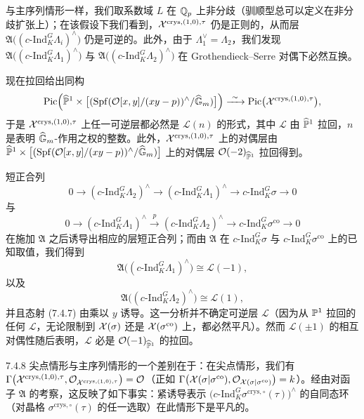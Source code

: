 与主序列情形一样，我们取系数域 $L$ 在 $\mathbb{Q}_p$ 上非分歧（驯顺型总可以定义在非分歧扩张上）；在该假设下我们看到，$\mathcal{X}^{\mathrm{crys},(1,0),\tau}$ 仍是正则的，从而层 $\mathfrak A\bigl((c\text{-}\mathrm{Ind}_K^G\Lambda_i)^\wedge\bigr)$ 仍是可逆的。此外，由于 $\Lambda_1^\vee=\Lambda_2$，我们发现 $\mathfrak A\bigl((c\text{-}\mathrm{Ind}_K^G\Lambda_1)^\wedge\bigr)$ 与 $\mathfrak A\bigl((c\text{-}\mathrm{Ind}_K^G\Lambda_2)^\wedge\bigr)$ 在 Grothendieck--Serre 对偶下必然互换。

现在拉回给出同构
\[
\mathrm{Pic}\Bigl(\widehat{\mathbb{P}}^{1}\times\bigl[(\operatorname{Spf}(\mathcal{O}[x,y]/(xy-p))^{\wedge}/\widehat{\mathbb{G}}_m)\bigr]\Bigr)
\xrightarrow{\ \sim\ }\mathrm{Pic}\bigl(\mathcal{X}^{\mathrm{crys},(1,0),\tau}\bigr),
\]
于是 $\mathcal{X}^{\mathrm{crys},(1,0),\tau}$ 上任一可逆层都必然是 $\mathcal L(n)$ 的形式，其中 $\mathcal L$ 由 $\widehat{\mathbb{P}}^{1}$ 拉回，$n$ 是表明 $\widehat{\mathbb{G}}_m$-作用之权的整数。此外，$\mathcal{X}^{\mathrm{crys},(1,0),\tau}$ 上的对偶层由 $\widehat{\mathbb{P}}^{1}\times\bigl[(\operatorname{Spf}(\mathcal{O}[x,y]/(xy-p))^{\wedge}/\widehat{\mathbb{G}}_m)\bigr]$ 上的对偶层 $\mathcal{O}(-2)_{\widehat{\mathbb{P}}^{1}}$ 拉回得到。

短正合列
\[
0\to(c\text{-}\mathrm{Ind}_K^G\Lambda_2)^\wedge\to(c\text{-}\mathrm{Ind}_K^G\Lambda_1)^\wedge\to c\text{-}\mathrm{Ind}_K^G\sigma\to0
\]
与
\[
0\to(c\text{-}\mathrm{Ind}_K^G\Lambda_1)^\wedge\xrightarrow{\ p\ }(c\text{-}\mathrm{Ind}_K^G\Lambda_2)^\wedge\to c\text{-}\mathrm{Ind}_K^G\sigma^{\mathrm{co}}\to0
\]
在施加 $\mathfrak A$ 之后诱导出相应的层短正合列；而由 $\mathfrak A$ 在 $c\text{-}\mathrm{Ind}_K^G\sigma$ 与 $c\text{-}\mathrm{Ind}_K^G\sigma^{\mathrm{co}}$ 上的已知取值，我们得到
\[
\mathfrak A\bigl((c\text{-}\mathrm{Ind}_K^G\Lambda_1)^\wedge\bigr)\cong\mathcal L(-1),
\]
以及
\[
\mathfrak A\bigl((c\text{-}\mathrm{Ind}_K^G\Lambda_2)^\wedge\bigr)\cong\mathcal L(1),
\]
并且态射 (7.4.7) 由乘以 $y$ 诱导。这一分析并不确定可逆层 $\mathcal L$（因为从 $\mathbb{P}^{1}$ 拉回的任何 $\mathcal L$，无论限制到 $\mathcal{X}(\sigma)$ 还是 $\mathcal{X}(\sigma^{\mathrm{co}})$ 上，都必然平凡）。然而 $\mathcal L(\pm1)$ 的相互对偶性随后表明，$\mathcal L$ 必是 $\mathcal{O}(-1)_{\widehat{\mathbb{P}}^{1}}$ 的拉回。

\begin{rem}{7.4.8}\label{thm:a4-7-4-8}
尖点情形与主序列情形的一个差别在于：在尖点情形，我们有 $\Gamma\bigl(\mathcal{X}^{\mathrm{crys},(1,0),\tau},\mathcal{O}_{\mathcal{X}^{\mathrm{crys},(1,0),\tau}}\bigr)=\mathcal{O}$（正如 $\Gamma\bigl(\mathcal{X}(\sigma|\sigma^{\mathrm{co}}),\mathcal{O}_{\mathcal{X}(\sigma|\sigma^{\mathrm{co}})}\bigr)=k$）。经由对函子 $\mathfrak A$ 的考察，这反映了如下事实：紧诱导表示 $\bigl(c\text{-}\mathrm{Ind}_K^G\sigma^{\mathrm{crys},\circ}(\tau)\bigr)^\wedge$ 的自同态环（对晶格 $\sigma^{\mathrm{crys},\circ}(\tau)$ 的任一选取）在此情形下是平凡的。
\end{rem}

